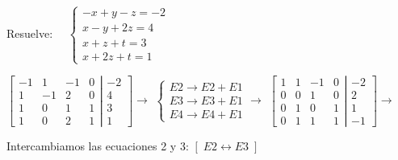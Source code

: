 \begin{ejre} 
Resuelve: $ \quad \begin{cases}-x+y-z=-2\\x-y+2z=4\\x+z+t=3\\x+2z+t=1 \end{cases}$
\end{ejre}
\begin{proofw}\renewcommand{\qedsymbol}{$\diamond$}

$\left[ \begin{matrix}
 -1 & 1 & -1 & 0\\ 1 & -1 & 2 & 0 \\ 1 & 0 & 1 & 1 \\ 1 & 0 & 2 & 1 
 \end{matrix}\right. 
 \left| \begin{matrix}
  -2 \\ 4 \\ 3  \\ 1
 \end{matrix}\right] \to$
\textcolor{gris}{$\begin{cases} E2 \to E2+E1 \\ E3 \to E3+E1 \\ E4 \to E4+E1 \end{cases} \to $}
$\left[ \begin{matrix}
 1 & 1 & -1 & 0\\ 0 & 0 & 1 & 0 \\ 0 & 1 & 0 & 1 \\ 0 & 1 & 1 & 1 
 \end{matrix}\right. 
 \left| \begin{matrix}
  -2 \\ 2 \\ 1  \\ -1
 \end{matrix}\right] \to$
 
Intercambiamos las ecuaciones 2 y 3: \textcolor{gris}{$[\;E2 \leftrightarrow E3 \; ]$}


\end{proofw}
